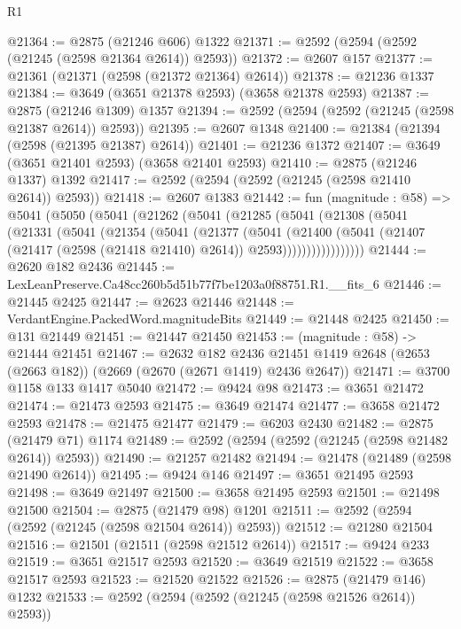 \begin{lexlean}{R1}
\begin{coremodule}
@21364 := @2875 (@21246 @606) @1322
@21371 := @2592 (@2594 (@2592 (@21245 (@2598 @21364 @2614)) @2593))
@21372 := @2607 @157
@21377 := @21361 (@21371 (@2598 (@21372 @21364) @2614))
@21378 := @21236 @1337
@21384 := @3649 (@3651 @21378 @2593) (@3658 @21378 @2593)
@21387 := @2875 (@21246 @1309) @1357
@21394 := @2592 (@2594 (@2592 (@21245 (@2598 @21387 @2614)) @2593))
@21395 := @2607 @1348
@21400 := @21384 (@21394 (@2598 (@21395 @21387) @2614))
@21401 := @21236 @1372
@21407 := @3649 (@3651 @21401 @2593) (@3658 @21401 @2593)
@21410 := @2875 (@21246 @1337) @1392
@21417 := @2592 (@2594 (@2592 (@21245 (@2598 @21410 @2614)) @2593))
@21418 := @2607 @1383
@21442 := fun (magnitude : @58) =>
  @5041
    (@5050
      (@5041
        (@21262
          (@5041
            (@21285
              (@5041
                (@21308
                  (@5041
                    (@21331
                      (@5041
                        (@21354
                          (@5041
                            (@21377
                              (@5041
                                (@21400
                                  (@5041
                                    (@21407
                                      (@21417 (@2598 (@21418 @21410) @2614))
                                      @2593)))))))))))))))))
@21444 := @2620 @182 @2436
@21445 := LexLeanPreserve.Ca48cc260b5d51b77f7be1203a0f88751.R1.__fits_6
@21446 := @21445 @2425
@21447 := @2623 @21446
@21448 := VerdantEngine.PackedWord.magnitudeBits
@21449 := @21448 @2425
@21450 := @131 @21449
@21451 := @21447 @21450
@21453 := (magnitude : @58) -> @21444 @21451
@21467 := @2632
    @182
    @2436
    @21451
    @1419
    @2648
    (@2653 (@2663 @182))
    (@2669 (@2670 (@2671 @1419) @2436 @2647))
@21471 := @3700 @1158 @133 @1417 @5040
@21472 := @9424 @98
@21473 := @3651 @21472
@21474 := @21473 @2593
@21475 := @3649 @21474
@21477 := @3658 @21472 @2593
@21478 := @21475 @21477
@21479 := @6203 @2430
@21482 := @2875 (@21479 @71) @1174
@21489 := @2592 (@2594 (@2592 (@21245 (@2598 @21482 @2614)) @2593))
@21490 := @21257 @21482
@21494 := @21478 (@21489 (@2598 @21490 @2614))
@21495 := @9424 @146
@21497 := @3651 @21495 @2593
@21498 := @3649 @21497
@21500 := @3658 @21495 @2593
@21501 := @21498 @21500
@21504 := @2875 (@21479 @98) @1201
@21511 := @2592 (@2594 (@2592 (@21245 (@2598 @21504 @2614)) @2593))
@21512 := @21280 @21504
@21516 := @21501 (@21511 (@2598 @21512 @2614))
@21517 := @9424 @233
@21519 := @3651 @21517 @2593
@21520 := @3649 @21519
@21522 := @3658 @21517 @2593
@21523 := @21520 @21522
@21526 := @2875 (@21479 @146) @1232
@21533 := @2592 (@2594 (@2592 (@21245 (@2598 @21526 @2614)) @2593))

\end{coremodule}
\end{lexlean}

